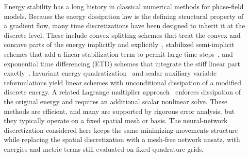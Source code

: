\documentclass[11pt,letterpaper]{article}
\theoremstyle{plain}
\theoremstyle{definition}
\begin{document}
Energy stability has a long history in classical numerical methods for phase-field models. Because the energy dissipation law is the defining structural property of a gradient flow, many time discretizations have been designed to inherit it at the discrete level. These include convex splitting schemes that treat the convex and concave parts of the energy implicitly and explicitly~\cite{eyre1998unconditionally}, stabilized semi-implicit schemes that add a linear stabilization term to permit large time steps~\cite{Shen2010}, and exponential time differencing (ETD) schemes that integrate the stiff linear part exactly~\cite{Du2019ETD}. Invariant energy quadratization~\cite{Yang2016IEQ} and scalar auxiliary variable~\cite{Shen2018SAV} reformulations yield linear schemes with unconditional dissipation of a modified discrete energy. A related Lagrange multiplier approach~\cite{Cheng2020Lagrange} enforces dissipation of the original energy and requires an additional scalar nonlinear solve. These methods are efficient, and many are supported by rigorous error analysis, but they typically operate on a fixed spatial mesh or basis. The neural-network discretization considered here keeps the same minimizing-movements structure while replacing the spatial discretization with a mesh-free network ansatz, with energies and metric terms still evaluated on fixed quadrature grids.
\end{document}
